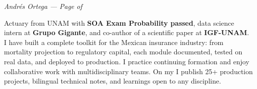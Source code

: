 \documentclass[10pt, letterpaper]{awesome-cv}
\renewcommand{\acvSectionContentTopSkip}{0.3mm}
\renewenvironment{cvparagraph}{%
  \vspace{\acvSectionContentTopSkip}%
  \vspace{-3mm}%
  \paragraphstyle%
}{%
  \par%
  \vspace{0.3mm}%
}
\renewcommand*{\paragraphstyle}{\fontsize{8.5pt}{1.15em}\bodyfontlight\upshape\color{text}}
\begin{document}
\makecvheader[C]


\makecvfooter
  {}
  {\color{lightgray}\textit{\small Andrés Ortega — Page \thepage{} of \pageref*{LastPage}}}
  {}


\begin{cvparagraph}
Actuary from UNAM with \textbf{SOA Exam Probability passed}, data science intern at \textbf{Grupo Gigante}, and co-author of a scientific paper at \textbf{IGF-UNAM}. I have built a complete toolkit for the Mexican insurance industry: from mortality projection to regulatory capital, each module documented, tested on real data, and deployed to production. I practice continuing formation and enjoy collaborative work with multidisciplinary teams. On my  I publish 25+ production projects, bilingual technical notes, and learnings open to any discipline.
\end{cvparagraph}

\end{document}
